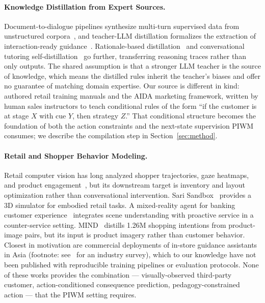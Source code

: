 \documentclass{article}
\begin{document}
\paragraph{Knowledge Distillation from Expert Sources.}
Document-to-dialogue pipelines synthesize multi-turn supervised data from unstructured corpora~\cite{R2S,SamsungManual}, and teacher-LLM distillation formalizes the extraction of interaction-ready guidance~\cite{GER}. Rationale-based distillation~\cite{RBKD} and conversational tutoring self-distillation~\cite{TutoringSelfDistill} go further, transferring reasoning traces rather than only outputs. The shared assumption is that a stronger LLM teacher is the source of knowledge, which means the distilled rules inherit the teacher's biases and offer no guarantee of matching domain expertise. Our source is different in kind: authored retail training manuals and the AIDA marketing framework, written by human sales instructors to teach conditional rules of the form ``if the customer is at stage $X$ with cue $Y$, then strategy $Z$.'' That conditional structure becomes the foundation of both the action constraints and the next-state supervision PIWM consumes; we describe the compilation step in Section~\ref{sec:method}.

\paragraph{Retail and Shopper Behavior Modeling.}
Retail computer vision has long analyzed shopper trajectories, gaze heatmaps, and product engagement~\cite{RetailCVSurvey}, but its downstream target is inventory and layout optimization rather than conversational intervention. Sari Sandbox~\cite{SariSandbox} provides a 3D simulator for embodied retail tasks. A mixed-reality agent for banking customer experience~\cite{FinancialCX3D} integrates scene understanding with proactive service in a counter-service setting. MIND~\cite{MIND} distills 1.26M shopping intentions from product-image pairs, but its input is product imagery rather than customer behavior. Closest in motivation are commercial deployments of in-store guidance assistants in Asia (footnote: see~\cite{IndustrialDeployments} for an industry survey), which to our knowledge have not been published with reproducible training pipelines or evaluation protocols. None of these works provides the combination --- visually-observed third-party customer, action-conditioned consequence prediction, pedagogy-constrained action --- that the PIWM setting requires.
\end{document}

